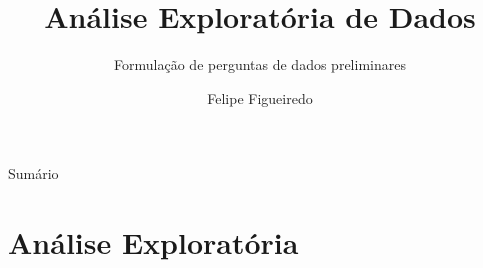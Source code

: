 \documentclass{beamer}
\title%
{Análise Exploratória de Dados}
\subtitle
{Formulação de perguntas de dados preliminares} %
\author%
{Felipe Figueiredo}%
\institute[INTO] %
{Instituto Nacional de Traumatologia e Ortopedia
}
\date%
{}
\begin{document}
\begin{frame}
  \titlepage
\end{frame}

\begin{frame}{Sumário}
  \tableofcontents
\end{frame}








\section{Análise Exploratória}
\end{document}
